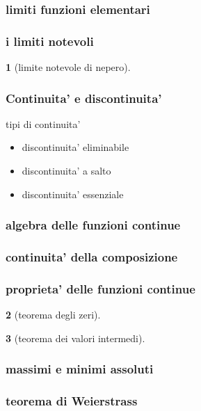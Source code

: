 \documentclass{article}
\theoremstyle{mystyle}
\newtheorem*{mydefinition}{}
\begin{document}
\subsubsection{limiti funzioni elementari}
\subsubsection{i limiti notevoli}
\begin{mydefinition}[limite notevole di nepero]
    
\end{mydefinition}
\subsubsection{Continuita' e discontinuita'}
tipi di continuita'
\begin{itemize}
    \item discontinuita' eliminabile
    \item discontinuita' a salto
    \item discontinuita' essenziale
\end{itemize}
\subsubsection{algebra delle funzioni continue}
\subsubsection{continuita' della composizione}
\subsubsection{proprieta' delle funzioni continue}
\begin{mydefinition}[teorema degli zeri]
    
\end{mydefinition}
\begin{mydefinition}[teorema dei valori intermedi]
    
\end{mydefinition}
\subsubsection{massimi e minimi assoluti}

\subsubsection{teorema di Weierstrass}
\end{document}
